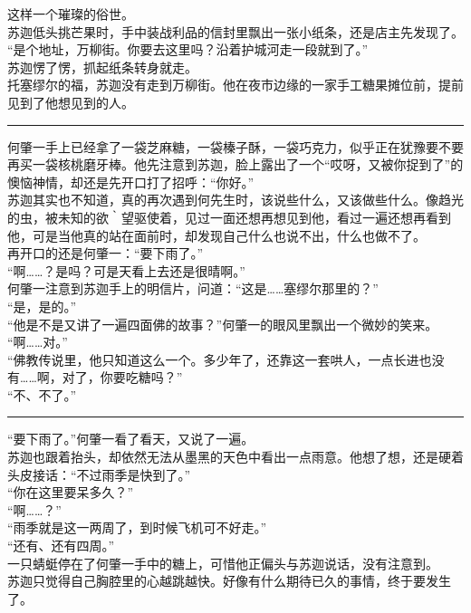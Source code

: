 \documentclass[oneside,11pt]{memoir} %
\begin{document}
\begin{CJK}{UTF8}{gbsn}
    这样一个璀璨的俗世。\\\indent
    苏迦低头挑芒果时，手中装战利品的信封里飘出一张小纸条，还是店主先发现了。\\\indent
    “是个地址，万柳街。你要去这里吗？沿着护城河走一段就到了。”\\\indent
    苏迦愣了愣，抓起纸条转身就走。\\\indent
    托塞缪尔的福，苏迦没有走到万柳街。他在夜市边缘的一家手工糖果摊位前，提前见到了他想见到的人。\\\indent
  \rule{-3pt}{30pt}
    何肇一手上已经拿了一袋芝麻糖，一袋榛子酥，一袋巧克力，似乎正在犹豫要不要再买一袋核桃磨牙棒。他先注意到苏迦，脸上露出了一个“哎呀，又被你捉到了”的懊恼神情，却还是先开口打了招呼：“你好。”\\\indent
    苏迦其实也不知道，真的再次遇到何先生时，该说些什么，又该做些什么。像趋光的虫，被未知的欲｀望驱使着，见过一面还想再想见到他，看过一遍还想再看到他，可是当他真的站在面前时，却发现自己什么也说不出，什么也做不了。\\\indent
    再开口的还是何肇一：“要下雨了。”\\\indent
    “啊……？是吗？可是天看上去还是很晴啊。”\\\indent
    何肇一注意到苏迦手上的明信片，问道：“这是……塞缪尔那里的？”\\\indent
    “是，是的。”\\\indent
    “他是不是又讲了一遍四面佛的故事？”何肇一的眼风里飘出一个微妙的笑来。\\\indent
    “啊……对。”\\\indent
    “佛教传说里，他只知道这么一个。多少年了，还靠这一套哄人，一点长进也没有……啊，对了，你要吃糖吗？”\\\indent
    “不、不了。” \\\indent    
  \rule{-3pt}{30pt}
    “要下雨了。”何肇一看了看天，又说了一遍。\\\indent
    苏迦也跟着抬头，却依然无法从墨黑的天色中看出一点雨意。他想了想，还是硬着头皮接话：“不过雨季是快到了。”\\\indent
    “你在这里要呆多久？”\\\indent
    “啊……？”\\\indent
    “雨季就是这一两周了，到时候飞机可不好走。”\\\indent
    “还有、还有四周。”\\\indent
    一只蜻蜓停在了何肇一手中的糖上，可惜他正偏头与苏迦说话，没有注意到。\\\indent
    苏迦只觉得自己胸腔里的心越跳越快。好像有什么期待已久的事情，终于要发生了。\\\indent

\end{CJK}
\end{document}
